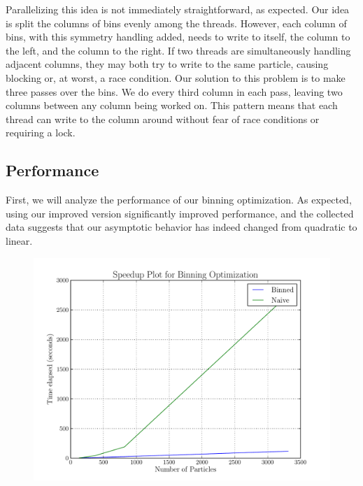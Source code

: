 \message{ !name(writeup.tex)}\documentclass[12pt]{article}
\def\ind{\vspace{0.75em}\noindent}
\begin{document}
\ind Parallelizing this idea is not immediately straightforward,
as expected. Our idea is split the columns of bins evenly among
the threads. However, each column of bins, with this symmetry handling
added, needs to write to itself, the column to the left, and the column
to the right. If two threads are simultaneously handling adjacent
columns, they may both try to write to the same particle, causing
blocking or, at worst, a race condition. Our solution to this problem
is to make three passes over the bins. We do every third column in
each pass, leaving two columns between any column being worked on.
This pattern means that each thread can write to the column around without
fear of race conditions or requiring a lock.

\subsection*{Performance}
First, we will analyze the performance of our binning optimization.
As expected, using our improved version significantly improved performance,
and the collected data suggests that our asymptotic behavior has indeed
changed from quadratic to linear.

\begin{figure}[h!]
  \centering
  \includegraphics[scale=0.5]{bin_speedup.pdf}
\end{figure}
\end{document}
